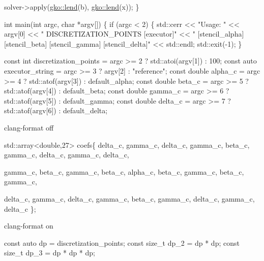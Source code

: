 \begin{DoxyCode}
    solver->apply(\hyperlink{namespacegko_aa8cb4876b72e5e1036ea9575443c439b}{gko::lend}(b), \hyperlink{namespacegko_aa8cb4876b72e5e1036ea9575443c439b}{gko::lend}(x));
\}

\textcolor{keywordtype}{int} main(\textcolor{keywordtype}{int} argc, \textcolor{keywordtype}{char} *argv[])
\{
    \textcolor{keywordflow}{if} (argc < 2) \{
        std::cerr
            << \textcolor{stringliteral}{"Usage: "} << argv[0] << \textcolor{stringliteral}{" DISCRETIZATION\_POINTS [executor]"}
            << \textcolor{stringliteral}{" [stencil\_alpha] [stencil\_beta] [stencil\_gamma] [stencil\_delta]"}
            << std::endl;
        std::exit(-1);
    \}

    \textcolor{keyword}{const} \textcolor{keywordtype}{int} discretization\_points = argc >= 2 ? std::atoi(argv[1]) : 100;
    \textcolor{keyword}{const} \textcolor{keyword}{auto} executor\_string = argc >= 3 ? argv[2] : \textcolor{stringliteral}{"reference"};
    \textcolor{keyword}{const} \textcolor{keywordtype}{double} alpha\_c = argc >= 4 ? std::atof(argv[3]) : default\_alpha;
    \textcolor{keyword}{const} \textcolor{keywordtype}{double} beta\_c = argc >= 5 ? std::atof(argv[4]) : default\_beta;
    \textcolor{keyword}{const} \textcolor{keywordtype}{double} gamma\_c = argc >= 6 ? std::atof(argv[5]) : default\_gamma;
    \textcolor{keyword}{const} \textcolor{keywordtype}{double} delta\_c = argc >= 7 ? std::atof(argv[6]) : default\_delta;
\end{DoxyCode}


clang-\/format off


\begin{DoxyCode}
std::array<double,27> coefs\{
    delta\_c, gamma\_c, delta\_c,
    gamma\_c, beta\_c, gamma\_c,
    delta\_c, gamma\_c, delta\_c,

    gamma\_c, beta\_c,  gamma\_c,
    beta\_c,  alpha\_c, beta\_c,
    gamma\_c, beta\_c,  gamma\_c,

    delta\_c, gamma\_c, delta\_c,
    gamma\_c, beta\_c, gamma\_c,
    delta\_c, gamma\_c, delta\_c
\};
\end{DoxyCode}


clang-\/format on


\begin{DoxyCode}
\textcolor{keyword}{const} \textcolor{keyword}{auto} dp = discretization\_points;
\textcolor{keyword}{const} \textcolor{keywordtype}{size\_t} dp\_2 = dp * dp;
\textcolor{keyword}{const} \textcolor{keywordtype}{size\_t} dp\_3 = dp * dp * dp;
\end{DoxyCode}


